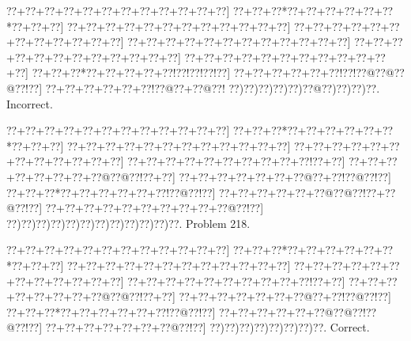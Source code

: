 \documentclass[a5paper]{article}
\begin{document}
\begin{center}
{\goo
\0??+\0??+\0??+\0??+\0??+\0??+\0??+\0??+\0??+\0??+\0??+\0??]
\0??+\0??+\0??*\0??+\0??+\0??+\0??+\0??+\0??*\0??+\0??+\0??]
\0??+\0??+\0??+\0??+\0??+\0??+\0??+\0??+\0??+\0??+\0??+\0??]
\0??+\0??+\0??+\0??+\0??+\0??+\0??+\0??+\0??+\0??+\0??+\0??]
\0??+\0??+\0??+\0??+\0??+\0??+\0??+\0??+\0??+\0??+\0??+\0??]
\0??+\0??+\0??+\0??+\0??+\0??+\0??+\0??+\0??+\0??+\0??+\0??]
\0??+\0??+\0??+\0??+\0??+\0??+\0??+\0??+\0??+\0??+\0??+\0??]
\0??+\0??+\0??*\0??+\0??+\0??+\0??+\0??!\0??!\0??!\0??!\0??]
\0??+\0??+\0??+\0??+\0??+\0??!\0??!\0??@\0??@\0??@\0??!\0??]
\0??+\0??+\0??+\0??+\0??+\0??!\0??@\0??+\0??@\0??!
\0??)\0??)\0??)\0??)\0??)\0??@\0??)\0??)\0??)\0??.
}
Incorrect. 

\end{center}
\newpage
\begin{center}
{\goo
\0??+\0??+\0??+\0??+\0??+\0??+\0??+\0??+\0??+\0??+\0??+\0??]
\0??+\0??+\0??*\0??+\0??+\0??+\0??+\0??+\0??*\0??+\0??+\0??]
\0??+\0??+\0??+\0??+\0??+\0??+\0??+\0??+\0??+\0??+\0??+\0??]
\0??+\0??+\0??+\0??+\0??+\0??+\0??+\0??+\0??+\0??+\0??+\0??]
\0??+\0??+\0??+\0??+\0??+\0??+\0??+\0??+\0??+\0??!\0??+\0??]
\0??+\0??+\0??+\0??+\0??+\0??+\0??+\0??@\0??@\0??!\0??+\0??]
\0??+\0??+\0??+\0??+\0??+\0??+\0??@\0??+\0??!\0??@\0??!\0??]
\0??+\0??+\0??*\0??+\0??+\0??+\0??+\0??+\0??!\0??@\0??!\0??]
\0??+\0??+\0??+\0??+\0??+\0??@\0??@\0??!\0??+\0??@\0??!\0??]
\0??+\0??+\0??+\0??+\0??+\0??+\0??+\0??+\0??+\0??@\0??!\0??]
\0??)\0??)\0??)\0??)\0??)\0??)\0??)\0??)\0??)\0??)\0??)\0??.
}
Problem 218.

\end{center}
\begin{center}
{\goo
\0??+\0??+\0??+\0??+\0??+\0??+\0??+\0??+\0??+\0??+\0??+\0??]
\0??+\0??+\0??*\0??+\0??+\0??+\0??+\0??+\0??*\0??+\0??+\0??]
\0??+\0??+\0??+\0??+\0??+\0??+\0??+\0??+\0??+\0??+\0??+\0??]
\0??+\0??+\0??+\0??+\0??+\0??+\0??+\0??+\0??+\0??+\0??+\0??]
\0??+\0??+\0??+\0??+\0??+\0??+\0??+\0??+\0??+\0??!\0??+\0??]
\0??+\0??+\0??+\0??+\0??+\0??+\0??+\0??@\0??@\0??!\0??+\0??]
\0??+\0??+\0??+\0??+\0??+\0??+\0??@\0??+\0??!\0??@\0??!\0??]
\0??+\0??+\0??*\0??+\0??+\0??+\0??+\0??+\0??!\0??@\0??!\0??]
\0??+\0??+\0??+\0??+\0??+\0??@\0??@\0??!\0??@\0??!\0??]
\0??+\0??+\0??+\0??+\0??+\0??+\0??@\0??!\0??]
\0??)\0??)\0??)\0??)\0??)\0??)\0??)\0??.
}
Correct. 

\end{center}
\end{document}

